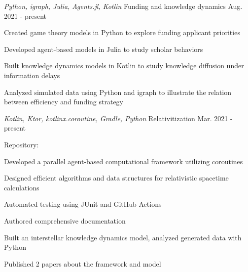 

\begin{cventries}

  \cventry
    {\emph{Python, igraph, Julia, Agents.jl, Kotlin}} %
    {Funding and knowledge dynamics} %
    {} %
    {Aug. 2021 - present} %
    {
      \begin{cvitems} %
        \item{Created game theory models in Python to explore funding applicant priorities}
        \item{Developed agent-based models in Julia to study scholar behaviors}
        \item{Built knowledge dynamics models in Kotlin to study knowledge diffusion under information delays}
        \item{Analyzed simulated data using Python and igraph to illustrate the relation between efficiency and funding strategy}
      \end{cvitems}
    }

  \cventry
    {\emph{Kotlin, Ktor, kotlinx.coroutine, Gradle, Python}} %
    {Relativitization} %
    {} %
    {Mar. 2021 - present} %
    {
      \begin{cvitems} %
        \item{Repository: \href{https://github.com/adriankhl/relativitization}{\underline{}}}
        \item{Developed a parallel agent-based computational framework utilizing coroutines}
        \item{Designed efficient algorithms and data structures for relativistic spacetime calculations}
        \item{Automated testing using JUnit and GitHub Actions}
        \item{Authored comprehensive documentation}
        \item{Built an interstellar knowledge dynamics model, analyzed generated data with Python}
        \item{Published 2 papers about the framework and model}
      \end{cvitems}
    }


\end{cventries}
